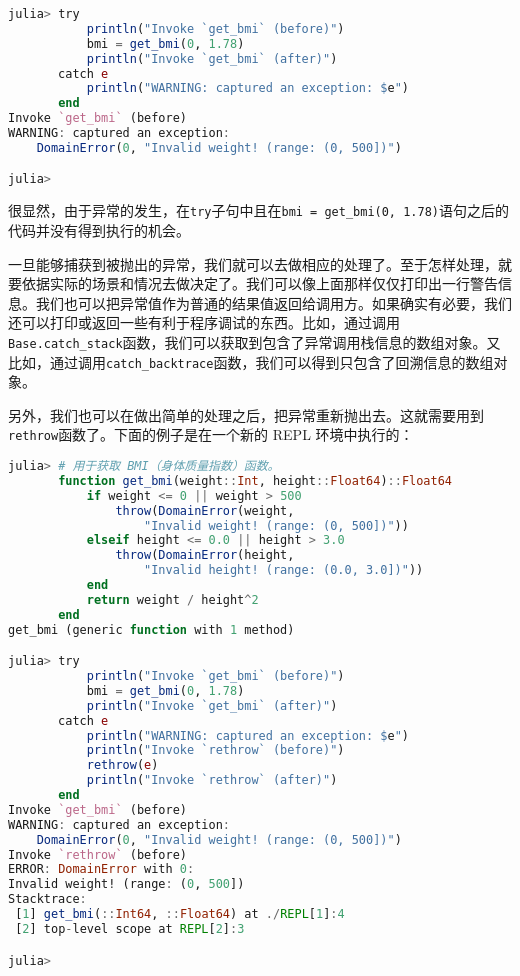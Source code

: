 \begin{lstlisting}[language=julia]
julia> try 
           println("Invoke `get_bmi` (before)")
           bmi = get_bmi(0, 1.78)
           println("Invoke `get_bmi` (after)")
       catch e
           println("WARNING: captured an exception: $e")
       end
Invoke `get_bmi` (before)
WARNING: captured an exception: 
    DomainError(0, "Invalid weight! (range: (0, 500])")

julia> 
\end{lstlisting}

很显然，由于异常的发生，在\verb|try|子句中且在\verb|bmi = get_bmi(0, 1.78)|语句之后的代码并没有得到执行的机会。

一旦能够捕获到被抛出的异常，我们就可以去做相应的处理了。至于怎样处理，就要依据实际的场景和情况去做决定了。我们可以像上面那样仅仅打印出一行警告信息。我们也可以把异常值作为普通的结果值返回给调用方。如果确实有必要，我们还可以打印或返回一些有利于程序调试的东西。比如，通过调用\verb|Base.catch_stack|函数，我们可以获取到包含了异常调用栈信息的数组对象。又比如，通过调用\verb|catch_backtrace|函数，我们可以得到只包含了回溯信息的数组对象。

另外，我们也可以在做出简单的处理之后，把异常重新抛出去。这就需要用到\verb|rethrow|函数了。下面的例子是在一个新的 REPL 环境中执行的：

\begin{lstlisting}[language=julia]
julia> # 用于获取 BMI（身体质量指数）函数。
       function get_bmi(weight::Int, height::Float64)::Float64
           if weight <= 0 || weight > 500
               throw(DomainError(weight, 
                   "Invalid weight! (range: (0, 500])"))
           elseif height <= 0.0 || height > 3.0
               throw(DomainError(height, 
                   "Invalid height! (range: (0.0, 3.0])"))
           end
           return weight / height^2
       end
get_bmi (generic function with 1 method)

julia> try 
           println("Invoke `get_bmi` (before)")
           bmi = get_bmi(0, 1.78)
           println("Invoke `get_bmi` (after)")
       catch e
           println("WARNING: captured an exception: $e")
           println("Invoke `rethrow` (before)")
           rethrow(e)
           println("Invoke `rethrow` (after)")
       end
Invoke `get_bmi` (before)
WARNING: captured an exception: 
    DomainError(0, "Invalid weight! (range: (0, 500])")
Invoke `rethrow` (before)
ERROR: DomainError with 0:
Invalid weight! (range: (0, 500])
Stacktrace:
 [1] get_bmi(::Int64, ::Float64) at ./REPL[1]:4
 [2] top-level scope at REPL[2]:3

julia> 
\end{lstlisting}

